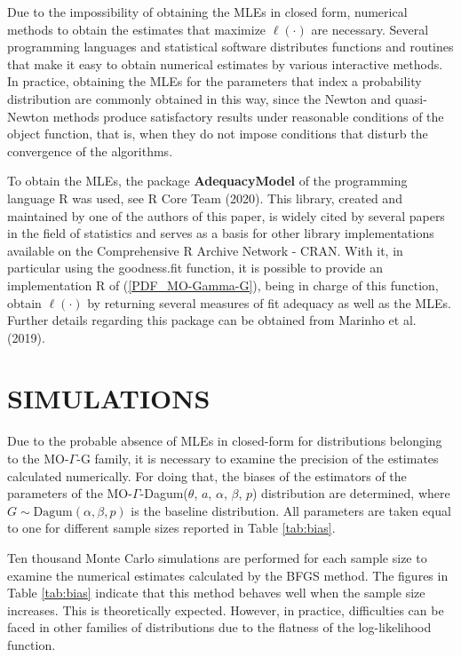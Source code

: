 \documentclass[twoside,leqno,11pt]{article}
\begin{document}
Due to the impossibility of obtaining the MLEs in closed form, numerical methods to obtain the estimates that maximize $ \ell (\cdot) $ are necessary. Several programming languages and statistical software distributes functions and routines that make it easy to obtain numerical estimates by various interactive methods. In practice, obtaining the MLEs for the parameters that index a probability distribution are commonly obtained in this way, since the Newton and quasi-Newton methods produce satisfactory results under reasonable conditions of the object function, that is, when they do not impose conditions that disturb the convergence of the algorithms.

To obtain the MLEs, the package {\bf AdequacyModel} of the programming language {\sf R} was used, see R Core Team (2020). This library, created and maintained by one of the authors of this paper, is widely cited by several papers in the field of statistics and serves as a basis for other library implementations available on the Comprehensive R Archive Network - CRAN.  With it, in particular using the goodness.fit function, it is possible to provide an implementation {\sf R} of (\ref {PDF_MO-Gamma-G}), being in charge of this function, obtain $\ell(\cdot)$  by returning several measures of fit adequacy as well as the MLEs. Further details regarding this package can be obtained from Marinho et al. (2019).


\section{SIMULATIONS}\label{sec:simulation}

Due to the probable absence of MLEs in closed-form for distributions belonging to the MO-$\Gamma $-G family, it is necessary to examine the
precision of the estimates calculated numerically. For doing that, the biases of the estimators of the parameters of the
MO-$\Gamma$-Dagum($\theta$, $a$, $\alpha$, $\beta$, $p$) distribution are determined, where $G\sim \mathrm {Dagum} (\alpha, \beta, p)$
is the baseline distribution. All parameters are taken equal to one for different sample sizes reported in Table \ref{tab:bias}.

Ten thousand Monte Carlo simulations are performed for each sample size to examine the numerical estimates calculated by the
BFGS method. The figures in Table \ref{tab:bias} indicate that this method behaves well when the sample size increases.
This is theoretically expected. However, in practice, difficulties can be faced in other families of distributions
due to the flatness of the log-likelihood function.
\end{document}
